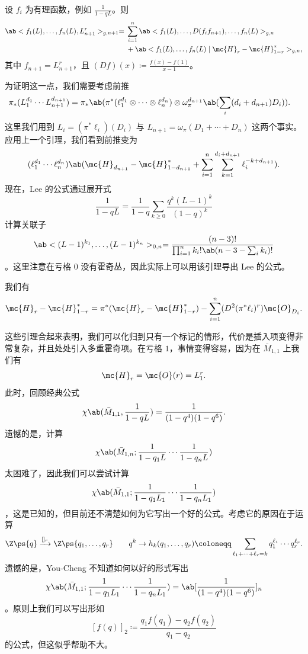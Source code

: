 \begin{lem}
    设 \(f_i\) 为有理函数，例如 \(\frac{1}{1-q L}\)。则
    \begin{align*}
        \ab<f_1(L), \ldots, f_n(L), L_{n+1}^r>_{g, n+1} ={}& \sum_{i=1}^n \ab<f_1(L), \ldots, D(f_i f_{n+1}), \ldots, f_n(L)>_{g, n} \\
        &+ \ab<f_1(L), \ldots, f_n(L) \mid \mc{H}_r - \mc{H}_{1-r}^*>_{g,n},
    \end{align*}
    其中 \(f_{n+1} = L_{n+1}^r\)，且 \((Df)(x) \coloneqq \frac{f(x)-f(1)}{x-1}\)。
\end{lem}

为证明这一点，我们需要考虑前推
\begin{align*}
    \pi_* (L_1^{d_1} \cdots L_{n+1}^{d_{n+1}}) &= \pi_* \ab(\pi^*(\ell_1^{d_1} \otimes \cdots \otimes \ell_n^{d_n}) \otimes \omega_{\pi}^{d_{n+1}}\ab(\sum_i (d_i+d_{n+1})D_i)).
\end{align*}
这里我们用到 \(L_i = (\pi^* \ell_i)(D_i)\) 与 \(L_{n+1} = \omega_{\pi}(D_1 + \cdots + D_n)\) 这两个事实。应用上一个引理，我们看到前推变为
\[ (\ell_1^{d_1} \cdots \ell_n^{d_n})\ab(\mc{H}_{d_{n+1}} - \mc{H}_{1-d_{n+1}}^* + \sum_{i=1}^n \sum_{k=1}^{d_i + d_{n+1}} \ell_i^{-k+d_{n+1}}). \]
现在，Lee 的公式通过展开式
\[ \frac{1}{1-qL} = \frac{1}{1-q} \sum_{k \geq 0} \frac{q^k(L-1)^k}{(1-q)^k} \]
计算关联子
\[ \ab<(L-1)^{k_1}, \ldots, (L-1)^{k_n}>_{0,n} = \frac{(n-3)!}{\prod_{i=1}^n k_i! \ab(n-3-\sum_i k_i)!} \]
。这里注意在亏格 \(0\) 没有霍奇丛，因此实际上可以用该引理导出 Lee 的公式。

\begin{lem}
    我们有
    \[ \mc{H}_r - \mc{H}_{1-r}^* = \pi^* (\mc{H}_r - \mc{H}_{1-r}^*) - \sum_{i=1}^n (D^2 (\pi^* \ell_i)^r) \mc{O}_{D_i}. \]
\end{lem}

这些引理合起来表明，我们可以化归到只有一个标记的情形，代价是插入项变得非常复杂，并且处处引入多重霍奇项。在亏格 \(1\)，事情变得容易，因为在 \(\bar{M}_{1,1}\) 上我们有
\[ \mc{H}_r = \mc{O}(r) = L_1^r. \]
此时，回顾经典公式
\[ \chi\ab(\bar{M}_{1,1}, \frac{1}{1-qL}) = \frac{1}{(1-q^4)(1-q^6)}. \]
遗憾的是，计算
\[ \chi\ab(\bar{M}_{1,n}; \frac{1}{1-q_1 L} \cdots \frac{1}{1-q_n L}) \]
太困难了，因此我们可以尝试计算
\[ \chi\ab(\bar{M}_{1,1}; \frac{1}{1-q_1 L_1} \cdots \frac{1}{1-q_n L_1})  \]
，这是已知的，但目前还不清楚如何为它写出一个好的公式。考虑它的原因在于运算
\[ \Z\ps{q} \xrightarrow{[]_r} \Z\ps{q_1, \ldots, q_r} \qquad q^k \to h_k(q_1, \ldots, q_r) \coloneqq \sum_{\ell_1 + \cdots + \ell_r = k} q_1^{\ell_1} \cdots q_r^{\ell_r}. \]
遗憾的是，You-Cheng 不知道如何以好的形式写出
\[ \chi\ab(\bar{M}_{1,1}; \frac{1}{1-q_1 L_1} \cdots \frac{1}{1-q_n L_1}) = \ab[\frac{1}{(1-q^4)(1-q^6)}]_n \]
。原则上我们可以写出形如
\[ [f(q)]_2 \coloneqq \frac{q_1 f(q_1) - q_2 f(q_2)}{q_1 - q_2} \]
的公式，但这似乎帮助不大。

